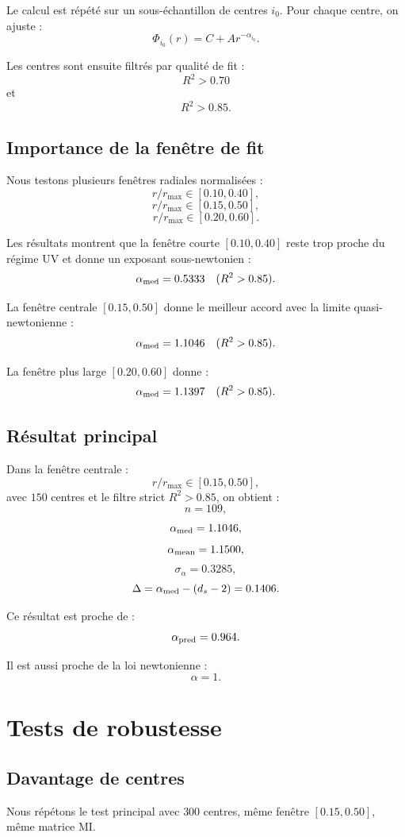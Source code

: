 \documentclass[11pt,a4paper]{article}
\begin{document}
Le calcul est répété sur un sous-échantillon de centres \(i_0\). Pour chaque
centre, on ajuste :
\[
\Phi_{i_0}(r)
=
C
+
A r^{-\alpha_{i_0}}.
\]

Les centres sont ensuite filtrés par qualité de fit :
\[
R^2>0.70
\]
et
\[
R^2>0.85.
\]

\subsection{Importance de la fenêtre de fit}

Nous testons plusieurs fenêtres radiales normalisées :
\[
r/r_{\max}\in[0.10,0.40],
\]
\[
r/r_{\max}\in[0.15,0.50],
\]
\[
r/r_{\max}\in[0.20,0.60].
\]

Les résultats montrent que la fenêtre courte \([0.10,0.40]\) reste trop proche
du régime UV et donne un exposant sous-newtonien :
\[
\alpha_{\rm med}=0.5333
\quad
(R^2>0.85).
\]

La fenêtre centrale \([0.15,0.50]\) donne le meilleur accord avec la limite
quasi-newtonienne :
\[
\alpha_{\rm med}=1.1046
\quad
(R^2>0.85).
\]

La fenêtre plus large \([0.20,0.60]\) donne :
\[
\alpha_{\rm med}=1.1397
\quad
(R^2>0.85).
\]

\subsection{Résultat principal}

Dans la fenêtre centrale :
\[
r/r_{\max}\in[0.15,0.50],
\]
avec \(150\) centres et le filtre strict \(R^2>0.85\), on obtient :
\[
n=109,
\]
\[
\alpha_{\rm med}=1.1046,
\]
\[
\alpha_{\rm mean}=1.1500,
\]
\[
\sigma_\alpha=0.3285,
\]
\[
\Delta
=
\alpha_{\rm med}
-
(d_s-2)
=
0.1406.
\]

Ce résultat est proche de :
\[
\alpha_{\rm pred}=0.964.
\]

Il est aussi proche de la loi newtonienne :
\[
\alpha=1.
\]

\section{Tests de robustesse}

\subsection{Davantage de centres}

Nous répétons le test principal avec \(300\) centres, même fenêtre
\([0.15,0.50]\), même matrice MI.
\end{document}
